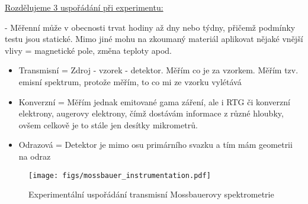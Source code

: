 \underline{Rozdělujeme 3 uspořádání při experimentu:}

- Měřenní může v obecnosti trvat hodiny až dny nebo týdny, přičemž podmínky testu jsou statické. Mimo jiné mohu na zkoumaný materiál aplikovat nějaké vnější vlivy = magnetické pole, změna teploty apod.

\begin{itemize}
    \item Transmisní = Zdroj - vzorek - detektor. Měřím co je za vzorkem. Měřím tzv. emisní spektrum, protože měřím, to co mi ze vzorku vylétává

    \item Konverzní = Měřím jednak emitované gama záření, ale i RTG či konverzní elektrony, augerovy elektrony, čímž dostávám informace z různé hloubky, ovšem celkově je to stále jen desítky mikrometrů.

    \item Odrazová = Detektor je mimo osu primárního svazku a tím mám geometrii na odraz
\end{itemize}


\begin{figure}[ht!]
    \centering
    \texttt{[image: figs/mossbauer\_instrumentation.pdf]}
    \caption{Experimentální uspořádání transmisní Mossbauerovy spektrometrie}
    \label{fig:2_6_mossbauer_zapojeni}
\end{figure}

%

